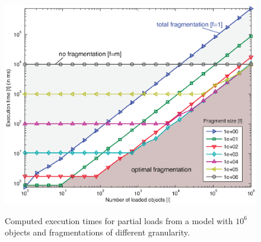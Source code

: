 \begin{figure}
\centering
\includegraphics[width=0.5\linewidth]{figures/theoryTimesSmall}
\label{fig:theoryTimesSmall}
\caption{Computed execution times for partial loads from a model with $10^6$ objects and fragmentations of different granularity.}
\end{figure}


